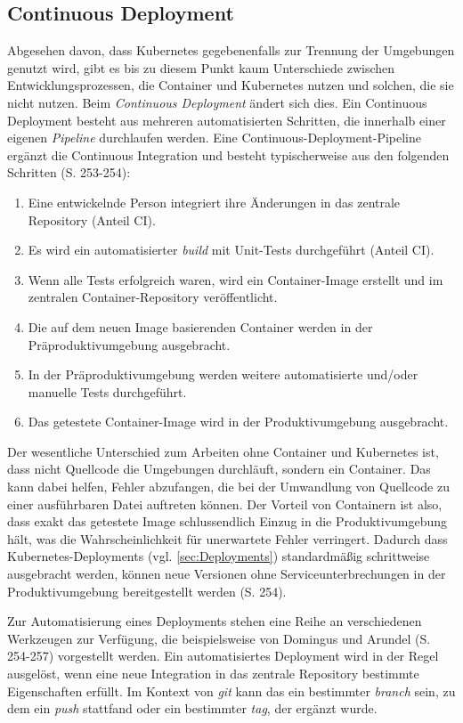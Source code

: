 \documentclass[11pt,a4paper]{article}
\begin{document}
\subsection{Continuous Deployment}
Abgesehen davon, dass Kubernetes gegebenenfalls zur Trennung der Umgebungen genutzt wird,
gibt es bis zu diesem Punkt kaum Unterschiede zwischen Entwicklungsprozessen,
die Container und Kubernetes nutzen und solchen, die sie nicht nutzen.
Beim \emph{Continuous Deployment} ändert sich dies.
Ein Continuous Deployment besteht aus mehreren automatisierten Schritten,
die innerhalb einer eigenen \emph{Pipeline} durchlaufen werden.
Eine Continuous-Deployment-Pipeline ergänzt die Continuous Integration
und besteht typischerweise aus den folgenden Schritten \cite{domingus2022cloud} (S. 253-254):
\begin{enumerate}
  \item Eine entwickelnde Person integriert ihre Änderungen in das zentrale Repository (Anteil CI).
  \item Es wird ein automatisierter \emph{build} mit Unit-Tests durchgeführt (Anteil CI).
  \item Wenn alle Tests erfolgreich waren, wird ein Container-Image erstellt und im zentralen Container-Repository veröffentlicht.
  \item Die auf dem neuen Image basierenden Container werden in der Präproduktivumgebung ausgebracht.
  \item In der Präproduktivumgebung werden weitere automatisierte und/oder manuelle Tests durchgeführt.
  \item Das getestete Container-Image wird in der Produktivumgebung ausgebracht.
\end{enumerate}
Der wesentliche Unterschied zum Arbeiten ohne Container und Kubernetes ist, dass nicht Quellcode
die Umgebungen durchläuft, sondern ein Container. Das kann dabei helfen, Fehler abzufangen,
die bei der Umwandlung von Quellcode zu einer ausführbaren Datei auftreten können.
Der Vorteil von Containern ist also, dass exakt das getestete Image schlussendlich
Einzug in die Produktivumgebung hält, was die Wahrscheinlichkeit für unerwartete Fehler verringert.
Dadurch dass Kubernetes-Deployments (vgl. \ref{sec:Deployments}) standardmäßig schrittweise ausgebracht werden,
können neue Versionen ohne Serviceunterbrechungen in der Produktivumgebung bereitgestellt werden \cite{domingus2022cloud} (S. 254).

Zur Automatisierung eines Deployments stehen eine Reihe an verschiedenen Werkzeugen
zur Verfügung, die beispielsweise von Domingus und Arundel \cite{domingus2022cloud} (S. 254-257)
vorgestellt werden. Ein automatisiertes Deployment wird in der Regel ausgelöst,
wenn eine neue Integration in das zentrale Repository bestimmte Eigenschaften erfüllt.
Im Kontext von \emph{git} kann das ein bestimmter \emph{branch} sein, zu dem
ein \emph{push} stattfand oder ein bestimmter \emph{tag}, der ergänzt wurde.
\end{document}
